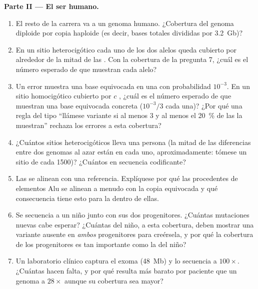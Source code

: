 \begin{problem}
\medskip
\noindent\textbf{Parte II --- El ser humano.}
\begin{enumerate}[resume]
  \item El resto de la carrera va a un genoma humano. ¿Cobertura del
        genoma diploide por copia haploide (es decir, bases totales
        divididas por \qty{3.2}{Gb})?
  \item En un sitio heterocigótico cada uno de los dos alelos queda
        cubierto por alrededor de la mitad de las . Con la
        cobertura de la pregunta 7, ¿cuál es el número esperado de
         que muestran cada alelo?
  \item Un error muestra una base equivocada en una  con
        probabilidad $10^{-3}$. En un sitio homocigótico cubierto por
        $c$ , ¿cuál es el número esperado de  que
        muestran una base equivocada concreta ($10^{-3}/3$ cada una)?
        ¿Por qué una regla del tipo ``llámese variante si al menos $3$
         y al menos el \qty{20}{\%} de las  la
        muestran'' rechaza los errores a esta cobertura?
  \item ¿Cuántos sitios heterocigóticos lleva una persona (la mitad de
        las diferencias entre dos genomas al azar están en cada uno,
        aproximadamente: tómese un sitio de cada \num{1500})? ¿Cuántos
        en secuencia codificante?
  \item Las  se alinean con una referencia. Explíquese por qué
        las  procedentes de elementos Alu se alinean a menudo
        con la copia equivocada y qué consecuencia tiene esto para la
         dentro de ellas.
  \item Se secuencia a un niño junto con sus dos progenitores. ¿Cuántas
        mutaciones nuevas cabe esperar? ¿Cuántas  del niño, a
        esta cobertura, deben mostrar una variante ausente en
        \emph{ambos} progenitores para creérsela, y por qué la cobertura
        de los progenitores es tan importante como la del niño?
  \item Un laboratorio clínico captura el exoma (\qty{48}{Mb}) y lo
        secuencia a $100\times$. ¿Cuántas  hacen falta, y por
        qué resulta más barato por paciente que un genoma a $28\times$
        aunque su cobertura sea mayor?
\end{enumerate}


\end{problem}
